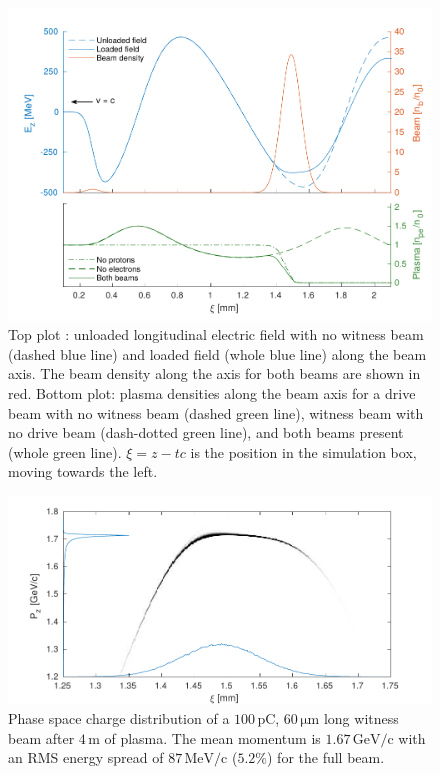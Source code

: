 \documentclass[aps,prstab,reprint,amsmath,amssymb,groupedaddress,onecolumn]{revtex4-1}
\newcommand{\unit}[1]{\,\mathrm{#1}}
\begin{document}
\begin{figure}[hbt]
    \includegraphics[width=\linewidth,trim={2mm 0mm 2mm 0mm},clip]{figures/beamLoading}
    \caption{\label{Fig:BeamLoading} Top plot%
: unloaded longitudinal electric field with no witness beam
        (dashed blue line) and %
        loaded field (whole blue line) along the beam axis. The beam density along the axis
        for both beams are shown in red. %
        Bottom plot: plasma densities along the beam axis for a drive
        beam with no witness beam (dashed green line), witness beam with no drive beam (dash-dotted green line), and
        both beams present (whole green line). $\xi = z - tc$ is the position in the simulation box, moving towards the
        left.}
\end{figure}

\begin{figure}[hbt]
    \includegraphics[width=\linewidth,trim={2mm 0mm 2mm 0mm},clip]{figures/beamPhaseSpace}
    \caption{\label{Fig:BeamPS} %
    Phase space charge distribution of a $100\unit{pC}$, $60\unit{\mu m}$ long witness
        beam after $4\unit{m}$ of plasma. The mean momentum is $1.67\unit{GeV/c}$ with an RMS energy spread of
        $87\unit{MeV/c}$ ($5.2\%$) for the full beam.}
\end{figure}
\end{document}
